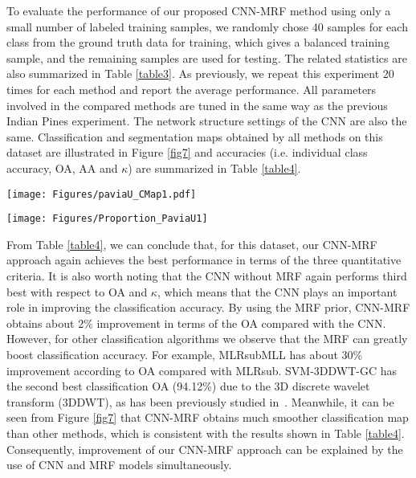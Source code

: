 \documentclass[journal]{IEEEtran}
\begin{document}
	
		To evaluate the performance of our proposed CNN-MRF method using only a small number of labeled training samples, we randomly chose 40 samples for each class from the ground truth data for training, which gives a balanced training sample, and the remaining samples are used for testing. The related statistics are also summarized in Table \ref{table3}. As previously, we repeat this experiment 20 times for each method and report the average performance. All parameters involved in the compared methods are tuned in the same way as the previous Indian Pines experiment. The network structure settings of the CNN are also the same. Classification and segmentation maps obtained by all methods on this dataset are illustrated in Figure  \ref{fig7} and accuracies (i.e. individual class accuracy, OA, AA and $\kappa$) are summarized in Table \ref{table4}.
		
		
		\begin{figure*}
			\centering
			\texttt{[image: Figures/paviaU\_CMap1.pdf]}
			\caption{{{Classification maps obtained by all competing methods on the Pavia University dataset (overall accuracies are reported in parentheses).}}}\label{fig7}
		\end{figure*}
		
		\begin{figure*}[t]
			\centering
			\texttt{[image: Figures/Proportion\_PaviaU1]}
			\caption{{{Overall accuracy (\%) obtained by all competing methods with different proportions of training samples on Pavia University dataset. (a) Classification results. (b) {{Regularized classification}} results.}}}\label{fig8}
		\end{figure*}
		
		From Table \ref{table4}, we can conclude that, for this dataset, our CNN-MRF approach again achieves the best performance in terms of the three quantitative criteria. It is also worth noting that the CNN without MRF again performs third best with respect to OA and $\kappa$, which means that the CNN plays {{an important}} role in improving the classification accuracy. By using the MRF prior, CNN-MRF obtains about 2\% improvement in terms of the OA compared with the CNN. However, for other {{classification}} algorithms we observe that the MRF can greatly boost classification accuracy. For example, MLRsubMLL has about 30\% improvement according to OA compared with MLRsub. SVM-3DDWT-GC has the second best {{classification}} OA (94.12\%) due to the 3D discrete wavelet transform (3DDWT), as has been previously studied in~\cite{cao2017integration}. Meanwhile, it can be seen from Figure  \ref{fig7} that CNN-MRF obtains much smoother {{classification}} map than other 
		methods, which is consistent with the results shown in Table \ref{table4}. Consequently, improvement of our CNN-MRF approach can be explained by the use of CNN and MRF models simultaneously. 
		
\end{document}
